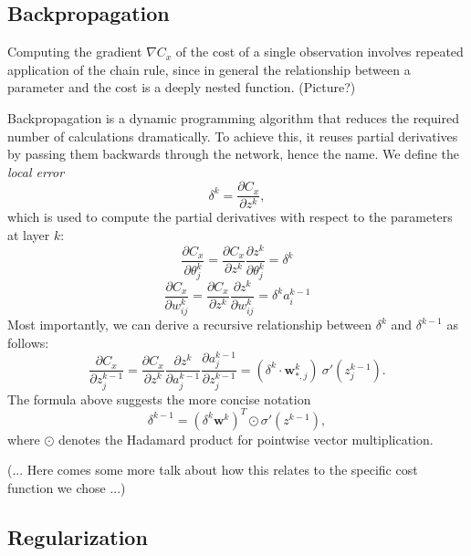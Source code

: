 \subsection{Backpropagation}

Computing the gradient \(\nabla C_x\) of the cost of a single observation involves repeated application of the chain rule, since in general the relationship between a parameter and the cost is a deeply nested function. 
\vspace{15em} (Picture?)

\noindent Backpropagation is a dynamic programming algorithm that reduces the required number of calculations dramatically. To achieve this, it reuses partial derivatives by passing them backwards through the network, hence the name. We define the \emph{local error}
\begin{equation}
    \delta^k = \frac{\partial C_x}{\partial z^k},
\end{equation}
which is used to compute the partial derivatives with respect to the parameters at layer \(k\):
\begin{equation}
    \frac{\partial C_x}{\partial \theta_j^k} =\frac{\partial C_x}{\partial z^k}\frac{\partial z^k}{\partial \theta_j^k}=\delta^k
\end{equation}
\begin{equation}
    \frac{\partial C_x}{\partial w_{ij}^k} = \frac{\partial C_x}{\partial z^k}\frac{\partial z^k}{\partial w_{ij}^k}=\delta^k a_i^{k-1}
\end{equation}
Most importantly, we can derive a recursive relationship between \(\delta^k\) and \(\delta^{k-1}\) as follows:
\begin{equation*}
    \frac{\partial C_x}{\partial z_j^{k-1}}=\frac{\partial C_x}{\partial z^k}\frac{\partial z^k}{\partial a_j^{k-1}}\frac{\partial a_j^{k-1}}{\partial z_j^{k-1}}=(\delta^k\cdot \mathbf{w}_{*,j}^k)\  \sigma'(z_j^{k-1}).
\end{equation*}
The formula above suggests the more concise notation
\begin{equation}
    \delta^{k-1}=(\delta^k\mathbf{w}^k)^T\odot \sigma'(z^{k-1}),
\end{equation}
where \(\odot\) denotes the Hadamard product for pointwise vector multiplication.

(... Here comes some more talk about how this relates to the specific cost function we chose ...)
\subsection{Regularization}
